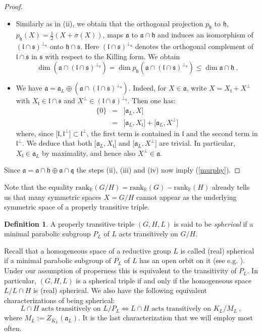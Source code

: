 \documentclass[10]{amsart}
\theoremstyle{remark}
\theoremstyle{definition}
\newtheorem{Def}[thm]{Definition}
\numberwithin{equation}{section}
\newcommand{\Rrank}{\text{rank}_{\mathbb{R}}}
\newcommand{\rank}{\text{rank}}
\newcommand{\id}{\mathrm{id}}
\newcommand{\fa}{{\mathfrak a}}             %
\newcommand{\fh}{{\mathfrak h}}
\newcommand{\fl}{{\mathfrak l}}
\newcommand{\fq}{{\mathfrak q}}
\newcommand{\fs}{{\mathfrak s}}
\newcommand{\be}{\begin{equation}}
\newcommand{\defn}{{:=}}
\begin{document}
{\begin{proof}
\begin{itemize}
$$ \dim \fa_L = \dim p_\fq(\fa_L)\le \dim \fa\cap \fq\ .$$
\item[(iii)] Similarly as in (ii), we obtain that the orthogonal projection $p_\fh$
to $\fh$,  $p_\fh (X)=\frac{1}{2}(X+\sigma(X))$, maps $\fa$ to $\fa\cap \fh$ and
induces an isomorphism of  $(\fl\cap\fs)^{\perp_\fs}$ onto $\fh\cap\fs$. Here $(\fl\cap\fs)^{\perp_\fs}$ denotes the orthogonal complement of $\fl\cap\fs$ in $\fs$ with respect to the Killing form. We obtain
$$ \dim  (\fa\cap(\fl\cap\fs)^{\perp_\fs}) = \dim p_\fh(\fa\cap(\fl\cap\fs)^{\perp_\fs})\le \dim \fa\cap \fh\ .$$
\item[(iv)] 
We have $\fa=\fa_L\oplus (\fa\cap(\fl\cap\fs)^{\perp_\fs})$. Indeed, for $X\in\fa$, write $X=X_\fl+X^\perp$ with $X_\fl\in\fl\cap\fs$ and $X^\perp\in(\fl\cap\fs)^{\perp_\fs}$. Then one has:
\begin{eqnarray*}
\{0\}&=&\lbrack\fa_L,X\rbrack\\
&=&\lbrack\fa_L,X_\fl\rbrack+\lbrack\fa_L,X^\perp\rbrack
\end{eqnarray*}
where, since $\lbrack\fl,\fl^\perp\rbrack\subset\fl^\perp$, the first term is contained in $\fl$ and the second term in $\fl^\perp$. We deduce that both 
$\lbrack\fa_L,X_\fl\rbrack$ and $\lbrack\fa_L,X^\perp\rbrack$ are trivial. In particular, $X_\fl\in\fa_L$ by maximality, and hence also $X^\perp\in\fa$. 
\end{itemize}
Since $\fa=\fa\cap\fh\oplus\fa\cap\fq$ the steps (ii), (iii) and (iv) now imply (\ref{murphy}).
\end{proof}
Note that the equality $\rank_{\mathbb {R}} (G/H)=\Rrank(G)-\Rrank(H)$ already tells us that many symmetric spaces $X=G/H$ cannot appear as the underlying
symmetric space of a properly transitive triple.

\begin{Def}\label{sphertriples}
A properly transitive triple $(G,H,L)$ is said to be {\it spherical} if a minimal parabolic subgroup $P_L$ of $L$ acts transitively on $G/H$.
\end{Def}

Recall that a homogeneous space  of a reductive group $L$ is called (real) spherical if a minimal parabolic subgroup of $P_L$ of $L$ has an open orbit on it (see e.g. \cite{KKPS}).
Under our assumption of properness this is equivalent to the transitivity of $P_L$. In particular, $(G,H,L)$  is a spherical triple if and only if the homogeneous space $L/L\cap H$ is
(real) spherical. We also have the following equivalent characterizations of being spherical:
\be\label{char}  L\cap H\mbox{ acts transitively on } L/P_L \Leftrightarrow  L\cap H\mbox{ acts transitively on } K_L/M_L\ ,
\end{equation}
where $M_L\defn Z_{K_L}(\fa_L)$. It is the last characterization that we will employ most often.


}
\end{document}
